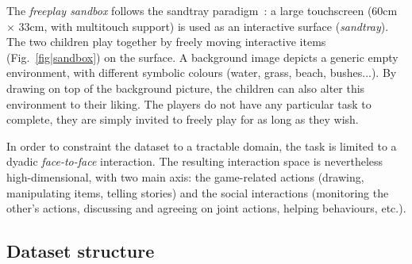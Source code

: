 \documentclass{article}
\begin{document}
The \emph{freeplay sandbox} follows the sandtray
paradigm~\cite{baxter2012touchscreen}: a large touchscreen (60cm $\times$ 33cm,
with multitouch support) is used as an interactive surface (\emph{sandtray}). The two children play together
by freely moving interactive items (Fig.~\ref{fig|sandbox}) on the surface. A background image
depicts a generic empty environment, with different symbolic colours (water,
grass, beach, bushes...). By drawing on top of the background picture, the
children can also alter this environment to their liking. The players do not have any particular task to
complete, they are simply invited to freely play for as long as they wish.

In order to constraint the dataset to a tractable domain, the task is limited to
a dyadic \emph{face-to-face} interaction.  The resulting interaction space is
nevertheless high-dimensional, with two main axis: the game-related actions
(drawing, manipulating items, telling stories) and the social interactions
(monitoring the other's actions, discussing and agreeing on joint actions,
helping behaviours, etc.).

%
%
%
%
%



\subsection{Dataset structure}
\end{document}
